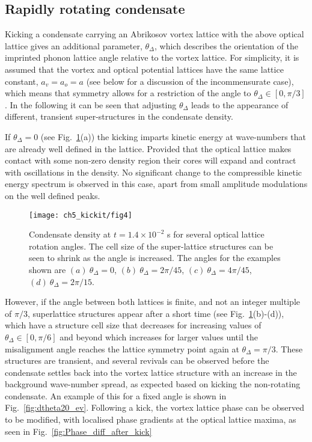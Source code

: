 \subsection{Rapidly rotating condensate}

    Kicking a condensate carrying an Abrikosov vortex lattice with the above optical lattice gives an additional parameter, $\theta_\Delta$, which describes the orientation of the imprinted phonon lattice angle relative to the vortex lattice. For simplicity, it is assumed that the vortex and optical potential lattices have the same lattice constant, $a_v=a_o=a$ (see below for a discussion of the incommensurate case), which means that symmetry allows for a restriction of the angle to $\theta_\Delta\in[0,\pi/3]$. In the following it can be seen that adjusting $\theta_\Delta$ leads to the appearance of different, transient super-structures in the condensate density.

    If $\theta_\Delta=0$ (see Fig.~\ref{fig:moire_density}(a)) the kicking imparts kinetic energy at wave-numbers that are already well defined in the lattice. Provided that the optical lattice makes contact with some non-zero density region their cores will expand and contract with oscillations in the density. No significant change to the compressible kinetic energy spectrum is observed in this case, apart from small amplitude modulations on the well defined peaks.

	\begin{figure}[ht]
        \centering
			\texttt{[image: ch5\_kickit/fig4]}
			\caption[Effect of kicking on condensate with a large vortex lattice.]{Condensate density at $t=1.4\times10^{-2}$ s for several optical lattice rotation angles. The cell size of the super-lattice structures can be seen to shrink as the angle is increased. The angles for the examples shown are $(a)~\theta_\Delta=0$, $(b)~\theta_\Delta=2\pi/45$, $(c)~\theta_\Delta=4\pi/45$, $(d)~\theta_\Delta=2\pi/15$. }
			\label{fig:moire_density}
		\end{figure}

    However, if the angle between both lattices is finite, and not an integer multiple of $\pi/3$, superlattice structures appear after a short time (see Fig.~\ref{fig:moire_density}(b)-(d)), which have a structure cell size that decreases for increasing values of $\theta_\Delta\in[0,\pi/6]$ and beyond which increases for larger values until the misalignment angle reaches the lattice symmetry point again at $\theta_\Delta=\pi/3$. These structures are transient, and several revivals can be observed before the condensate settles back into the vortex lattice structure with an increase in the background wave-number spread, as expected based on kicking the non-rotating condensate. An example of this for a fixed angle is shown in Fig.~\ref{fig:dtheta20_ev}. Following a kick, the vortex lattice phase can be observed to be modified, with localised phase gradients at the optical lattice maxima, as seen in Fig.~\ref{fig:Phase_diff_after_kick}

